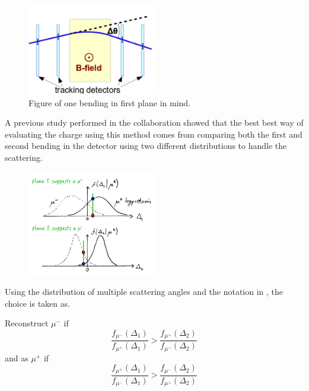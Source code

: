 \begin{figure}[h!]
\centering
\includegraphics[width=0.5\textwidth]{figures/lowP/scattering.jpeg}
\caption{Figure of one bending in first plane in mind.}
\label{fig:Scattering}
\end{figure}

A previous study performed in the collaboration showed that the best best way of evaluating the charge using this method comes from comparing both the first and second bending in the detector using two different distributions to handle the scattering.

\begin{figure}[h!]
\centering
\includegraphics[width=0.5\textwidth]{figures/lowP/null.jpg}
\caption{}
\label{fig:NullHyp}
\end{figure}

Using the distribution of multiple scattering angles and the notation in , the choice is taken as. 

Reconstruct $\mu^-$ if 
\begin{equation}
\frac{f_{\mu^-}(\Delta_1)}{f_{\mu^+}(\Delta_1)} > \frac{f_{\mu^+}(\Delta_2)}{f_{\mu^-}(\Delta_2)}
\end{equation}
and as $\mu^+$ if
\begin{equation}
\frac{f_{\mu^+}(\Delta_1)}{f_{\mu^-}(\Delta_1)} > \frac{f_{\mu^-}(\Delta_2)}{f_{\mu^+}(\Delta_2)}
\end{equation}




